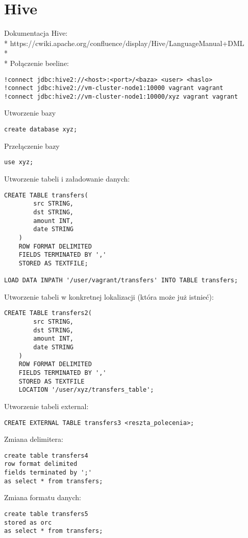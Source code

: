 \documentclass{article}
\begin{document}
\section*{Hive}

Dokumentacja Hive:
\\*
https://cwiki.apache.org/confluence/display/Hive/LanguageManual+DML
\\*
\\*
Połączenie beeline:
\begin{lstlisting}
!connect jdbc:hive2://<host>:<port>/<baza> <user> <haslo>
!connect jdbc:hive2://vm-cluster-node1:10000 vagrant vagrant
!connect jdbc:hive2://vm-cluster-node1:10000/xyz vagrant vagrant
\end{lstlisting}

Utworzenie bazy
\begin{lstlisting}
create database xyz;
\end{lstlisting}

Przełączenie bazy
\begin{lstlisting}
use xyz;
\end{lstlisting}

Utworzenie tabeli i załadowanie danych:
\begin{lstlisting}
CREATE TABLE transfers(
		src STRING,
		dst STRING,
		amount INT,
		date STRING
	)
	ROW FORMAT DELIMITED
	FIELDS TERMINATED BY ','
	STORED AS TEXTFILE;

LOAD DATA INPATH '/user/vagrant/transfers' INTO TABLE transfers;
\end{lstlisting}

Utworzenie tabeli w konkretnej lokalizacji (która może już istnieć):
\begin{lstlisting}
CREATE TABLE transfers2(
		src STRING,
		dst STRING,
		amount INT,
		date STRING
	)
	ROW FORMAT DELIMITED
	FIELDS TERMINATED BY ','
	STORED AS TEXTFILE
	LOCATION '/user/xyz/transfers_table';
\end{lstlisting}

Utworzenie tabeli external:
\begin{lstlisting}
CREATE EXTERNAL TABLE transfers3 <reszta_polecenia>;
\end{lstlisting}

Zmiana delimitera:
\begin{lstlisting}
create table transfers4
row format delimited
fields terminated by ';'
as select * from transfers;
\end{lstlisting}

Zmiana formatu danych:
\begin{lstlisting}
create table transfers5
stored as orc
as select * from transfers;
\end{lstlisting}
\end{document}
